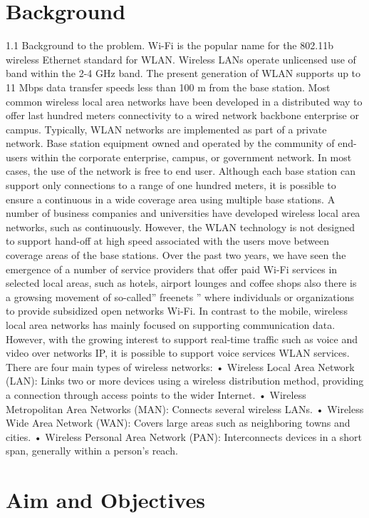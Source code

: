 \documentclass[10]{article}
\begin{document}
\section{Background}
1.1	Background to the problem.
Wi-Fi is the popular name for the 802.11b wireless Ethernet standard for WLAN. Wireless LANs operate unlicensed use of band within the 2-4 GHz band. The present generation of WLAN supports up to 11 Mbps data transfer speeds less than 100 m from the base station. Most common wireless local area networks have been developed in a distributed way to offer last hundred meters connectivity to a wired network backbone enterprise or campus. Typically, WLAN networks are implemented as part of a private network. Base station equipment owned and operated by the community of end-users within the corporate enterprise, campus, or government network. In most cases, the use of the network is free to end user.
Although each base station can support only connections to a range of one hundred meters, it is possible to ensure a continuous in a wide coverage area using multiple base stations. A number of business companies and universities have developed wireless local area networks, such as continuously. However, the WLAN technology is not designed to support hand-off at high speed associated with the users move between coverage areas of the base stations.
Over the past two years, we have seen the emergence of a number of service providers that offer paid Wi-Fi services in selected local areas, such as hotels, airport lounges and coffee shops also there is a growsing movement of so-called'' freenets '' where individuals or organizations to provide subsidized open networks Wi-Fi.
In contrast to the mobile, wireless local area networks has mainly focused on supporting communication data. However, with the growing interest to support real-time traffic such as voice and video over networks IP, it is possible to support voice services WLAN services.
There are four main types of wireless networks:
•	Wireless Local Area Network (LAN): Links two or more devices using a wireless distribution method, providing a connection through access points to the wider Internet.
•	Wireless Metropolitan Area Networks (MAN): Connects several wireless LANs.
•	Wireless Wide Area Network (WAN): Covers large areas such as neighboring towns and cities.
•	Wireless Personal Area Network (PAN): Interconnects devices in a short span, generally within a person’s reach.

\section{Aim and Objectives}
\end{document}

